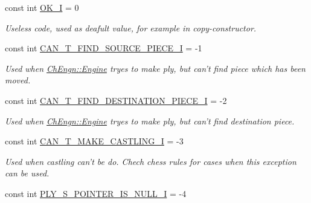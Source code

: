 \begin{DoxyCompactItemize}
\item 
\hypertarget{namespaceChEngn_a58f231c1008467b4b6cfb17b190293a5}{
const int \hyperlink{namespaceChEngn_a58f231c1008467b4b6cfb17b190293a5}{OK\_\-I} = 0}
\label{namespaceChEngn_a58f231c1008467b4b6cfb17b190293a5}

\begin{DoxyCompactList}\small\item\em Useless code, used as deafult value, for example in copy-\/constructor. \item\end{DoxyCompactList}\item 
\hypertarget{namespaceChEngn_a36e55f6e51b01a42dd9f96ee00ea449f}{
const int \hyperlink{namespaceChEngn_a36e55f6e51b01a42dd9f96ee00ea449f}{CAN\_\-T\_\-FIND\_\-SOURCE\_\-PIECE\_\-I} = -\/1}
\label{namespaceChEngn_a36e55f6e51b01a42dd9f96ee00ea449f}

\begin{DoxyCompactList}\small\item\em Used when \hyperlink{classChEngn_1_1Engine}{ChEngn::Engine} tryes to make ply, but can't find piece which has been moved. \item\end{DoxyCompactList}\item 
\hypertarget{namespaceChEngn_ac4cbfc0117c3f4f03371093971bd2a52}{
const int \hyperlink{namespaceChEngn_ac4cbfc0117c3f4f03371093971bd2a52}{CAN\_\-T\_\-FIND\_\-DESTINATION\_\-PIECE\_\-I} = -\/2}
\label{namespaceChEngn_ac4cbfc0117c3f4f03371093971bd2a52}

\begin{DoxyCompactList}\small\item\em Used when \hyperlink{classChEngn_1_1Engine}{ChEngn::Engine} tryes to make ply, but can't find destination piece. \item\end{DoxyCompactList}\item 
\hypertarget{namespaceChEngn_afa7a66c1b6f627c2188c24575c8b07ac}{
const int \hyperlink{namespaceChEngn_afa7a66c1b6f627c2188c24575c8b07ac}{CAN\_\-T\_\-MAKE\_\-CASTLING\_\-I} = -\/3}
\label{namespaceChEngn_afa7a66c1b6f627c2188c24575c8b07ac}

\begin{DoxyCompactList}\small\item\em Used when castling can't be do. Chech chess rules for cases when this exception can be used. \item\end{DoxyCompactList}\item 
\hypertarget{namespaceChEngn_a6760a84e5ef9de4cb6c0e7158965d51c}{
const int \hyperlink{namespaceChEngn_a6760a84e5ef9de4cb6c0e7158965d51c}{PLY\_\-S\_\-POINTER\_\-IS\_\-NULL\_\-I} = -\/4}
\label{namespaceChEngn_a6760a84e5ef9de4cb6c0e7158965d51c}


\end{DoxyCompactItemize}
